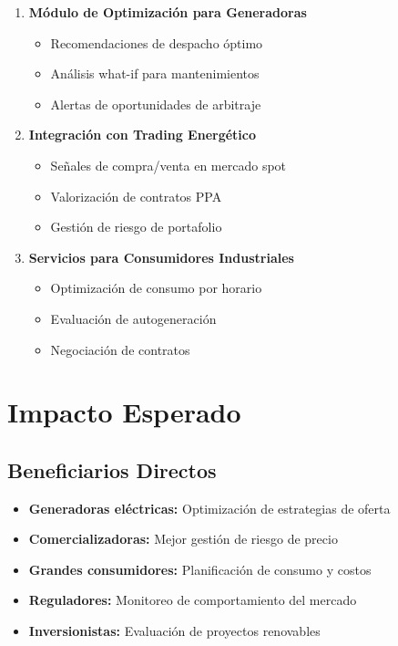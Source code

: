\documentclass[12pt,a4paper]{article}
\begin{document}
\begin{enumerate}
    \item \textbf{Módulo de Optimización para Generadoras}
    \begin{itemize}
        \item Recomendaciones de despacho óptimo
        \item Análisis what-if para mantenimientos
        \item Alertas de oportunidades de arbitraje
    \end{itemize}
    
    \item \textbf{Integración con Trading Energético}
    \begin{itemize}
        \item Señales de compra/venta en mercado spot
        \item Valorización de contratos PPA
        \item Gestión de riesgo de portafolio
    \end{itemize}
    
    \item \textbf{Servicios para Consumidores Industriales}
    \begin{itemize}
        \item Optimización de consumo por horario
        \item Evaluación de autogeneración
        \item Negociación de contratos
    \end{itemize}
\end{enumerate}

\section{Impacto Esperado}

\subsection{Beneficiarios Directos}

\begin{itemize}
    \item \textbf{Generadoras eléctricas:} Optimización de estrategias de oferta
    \item \textbf{Comercializadoras:} Mejor gestión de riesgo de precio
    \item \textbf{Grandes consumidores:} Planificación de consumo y costos
    \item \textbf{Reguladores:} Monitoreo de comportamiento del mercado
    \item \textbf{Inversionistas:} Evaluación de proyectos renovables
\end{itemize}
\end{document}

